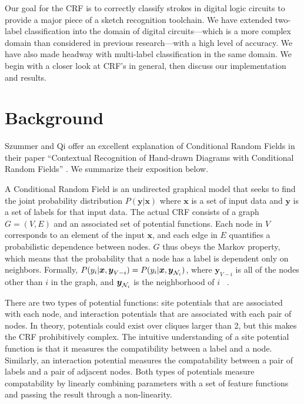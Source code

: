 \documentclass[10pt]{acmsiggraph}               %
\newcommand{\bm}[1]{\boldsymbol{#1}}
\begin{document}
Our goal for the CRF is to correctly classify strokes in digital logic circuits to provide a major piece of a sketch recognition toolchain.  We have extended two-label classification into the domain of digital circuits---which is a more complex domain than considered in previous research---with a high level of accuracy.  We have also made headway with multi-label classification in the same domain.  We begin with a closer look at CRF's in general, then discuss our implementation and results.

\section{Background}

Szummer and Qi offer an excellent explanation of Conditional Random Fields in their paper ``Contextual Recognition of Hand-drawn Diagrams with Conditional Random Fields'' \cite{szummer:CRFrecog}. We summarize their exposition below.

A Conditional Random Field is an undirected graphical model that seeks
to find the joint probability distribution $P(\bm{y} | \bm{x} )$ where
$\bm{x}$ is a set of input data and $\bm{y}$ is a set of labels for
that input data.  The actual CRF consists of a graph $G = (V,E)$ and
an associated set of potential functions.  Each node in $V$
corresponds to an element of the input $\bm{x}$, and each edge in $E$
quantifies a probabilistic dependence between nodes.  $G$ thus obeys
the Markov property, which means that the probability that a node has
a label is dependent only on neighbors.  Formally, $P(y_i | \bm{x},
\bm{y}_{V-i}) = P(y_i | \bm{x}, \bm{y}_{{\cal N}_i})$, where
$\bm{y}_{V-i}$ is all of the nodes other than $i$ in the graph, and
$\bm{y}_{{\cal N}_i}$ is the neighborhood of $i$
~\cite{szummer:CRFrecog}.

There are two types of potential functions: site potentials that are
associated with each node, and interaction potentials that are
associated with each pair of nodes.  In theory, potentials could exist
over cliques larger than 2, but this makes the CRF prohibitively
complex.  The intuitive understanding of a site potential function is
that it measures the compatibility between a label and a node.
Similarly, an interaction potential measures the compatability between
a pair of labels and a pair of adjacent nodes.  Both types of
potentials measure compatability by linearly combining parameters with
a set of feature functions and passing the result through a
non-linearity.
\end{document}
